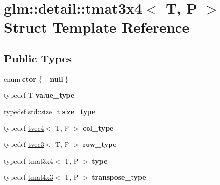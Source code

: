\hypertarget{structglm_1_1detail_1_1tmat3x4}{}\section{glm\+:\+:detail\+:\+:tmat3x4$<$ T, P $>$ Struct Template Reference}
\label{structglm_1_1detail_1_1tmat3x4}
\subsection*{Public Types}
\begin{DoxyCompactItemize}
\item 
enum {\bfseries ctor} \{ {\bfseries \+\_\+null}
 \}\hypertarget{structglm_1_1detail_1_1tmat3x4_aaf0d815b5c79dd7663c3532c8d03ade8}{}\label{structglm_1_1detail_1_1tmat3x4_aaf0d815b5c79dd7663c3532c8d03ade8}

\item 
typedef T {\bfseries value\+\_\+type}\hypertarget{structglm_1_1detail_1_1tmat3x4_a541331f60862c273694a0b1f778fd571}{}\label{structglm_1_1detail_1_1tmat3x4_a541331f60862c273694a0b1f778fd571}

\item 
typedef std\+::size\+\_\+t {\bfseries size\+\_\+type}\hypertarget{structglm_1_1detail_1_1tmat3x4_a6c23d9c4bf2cb48cfcdbec0b5d8451d2}{}\label{structglm_1_1detail_1_1tmat3x4_a6c23d9c4bf2cb48cfcdbec0b5d8451d2}

\item 
typedef \hyperlink{structglm_1_1detail_1_1tvec4}{tvec4}$<$ T, P $>$ {\bfseries col\+\_\+type}\hypertarget{structglm_1_1detail_1_1tmat3x4_aadea597c799e263c7580c0291753d0de}{}\label{structglm_1_1detail_1_1tmat3x4_aadea597c799e263c7580c0291753d0de}

\item 
typedef \hyperlink{structglm_1_1detail_1_1tvec3}{tvec3}$<$ T, P $>$ {\bfseries row\+\_\+type}\hypertarget{structglm_1_1detail_1_1tmat3x4_a4396c64d7fb3b10e98119bf1cac9ce9b}{}\label{structglm_1_1detail_1_1tmat3x4_a4396c64d7fb3b10e98119bf1cac9ce9b}

\item 
typedef \hyperlink{structglm_1_1detail_1_1tmat3x4}{tmat3x4}$<$ T, P $>$ {\bfseries type}\hypertarget{structglm_1_1detail_1_1tmat3x4_ace1e67378a63acf5b64fd4d363647502}{}\label{structglm_1_1detail_1_1tmat3x4_ace1e67378a63acf5b64fd4d363647502}

\item 
typedef \hyperlink{structglm_1_1detail_1_1tmat4x3}{tmat4x3}$<$ T, P $>$ {\bfseries transpose\+\_\+type}\hypertarget{structglm_1_1detail_1_1tmat3x4_a00d98ddf17fe798af973adf5a6916355}{}\label{structglm_1_1detail_1_1tmat3x4_a00d98ddf17fe798af973adf5a6916355}

\end{DoxyCompactItemize}
